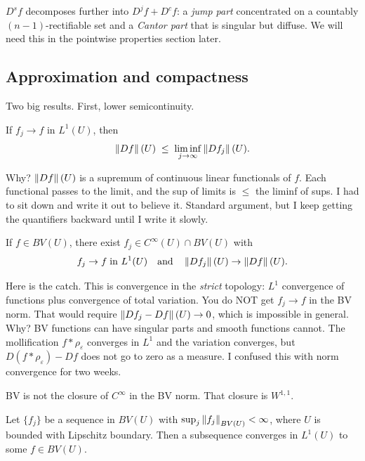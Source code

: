 $D^s f$ decomposes further into $D^j f + D^c f$: a \emph{jump part} concentrated on a countably $(n-1)$-rectifiable set and a \emph{Cantor part} that is singular but diffuse. We will need this in the pointwise properties section later.

\subsection{Approximation and compactness}\label{subsec:approx-compact}

Two big results. First, lower semicontinuity.

\begin{theorem}\label{thm:lsc-variation}
If $f_j \to f$ in $L^1(U)$, then
\[
  \left\|Df\right\|(U) \;\le\; \liminf_{j \to \infty} \left\|Df_j\right\|(U).
\]
\end{theorem}

Why? $\left\|Df\right\|(U)$ is a supremum of continuous linear functionals of $f$. Each functional passes to the limit, and the sup of limits is $\le$ the liminf of sups. I had to sit down and write it out to believe it. Standard argument, but I keep getting the quantifiers backward until I write it slowly.

\begin{theorem}\label{thm:approx-bv}
If $f \in BV(U)$, there exist $f_j \in C^\infty(U) \cap BV(U)$ with
\[
  f_j \to f \;\text{in } L^1(U) \quad\text{and}\quad \left\|Df_j\right\|(U) \to \left\|Df\right\|(U).
\]
\end{theorem}

Here is the catch. This is convergence in the \emph{strict} topology: $L^1$ convergence of functions plus convergence of total variation. You do NOT get $f_j \to f$ in the BV norm. That would require $\left\|Df_j - Df\right\|(U) \to 0$, which is impossible in general. Why? BV functions can have singular parts and smooth functions cannot. The mollification $f * \rho_\varepsilon$ converges in $L^1$ and the variation converges, but $D(f * \rho_\varepsilon) - Df$ does not go to zero as a measure. I confused this with norm convergence for two weeks.

BV is not the closure of $C^\infty$ in the BV norm. That closure is $W^{1,1}$.

\begin{theorem}[Compactness]\label{thm:compactness-bv}
Let $\{f_j\}$ be a sequence in $BV(U)$ with $\sup_j \left\|f_j\right\|_{BV(U)} < \infty$, where $U$ is bounded with Lipschitz boundary. Then a subsequence converges in $L^1(U)$ to some $f \in BV(U)$.
\end{theorem}

